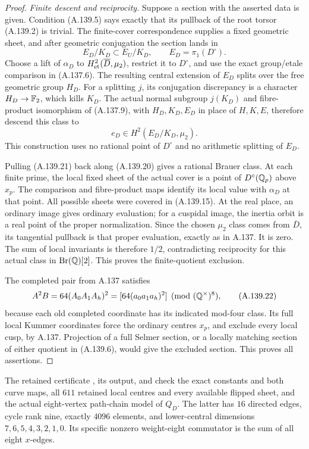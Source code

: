\begin{proof}
\emph{Finite descent and reciprocity.}
Suppose a section with the asserted data is given.
Condition (A.139.5) says exactly that its pullback of the root
torsor (A.139.2) is trivial.
The finite-cover correspondence supplies a fixed geometric sheet,
and after geometric conjugation the section lands in
\[
              E_D/K_D\subset E_U/K_D,\qquad
              E_D=\pi_1(D^\circ).
\tag{A.139.20}
\]
Choose a lift of \(\alpha_D\) to
\(H^2_{\rm et}(\overline D,\mu_2)\), restrict it to \(D^\circ\),
and use the exact group/etale comparison in (A.137.6).
The resulting central extension of \(E_D\) splits over the free
geometric group \(H_D\).
For a splitting \(j\), its conjugation discrepancy is a character
\(H_D\to\mathbb F_2\), which kills \(K_D\).
The actual normal subgroup \(j(K_D)\) and fibre-product isomorphism
of (A.137.9), with \(H_D,K_D,E_D\) in place of \(H,K,E\),
therefore descend this class to
\[
                               e_D\in H^2(E_D/K_D,\mu_2).
\tag{A.139.21}
\]
This construction uses no rational point of \(D^\circ\) and no
arithmetic splitting of \(E_D\).

Pulling (A.139.21) back along (A.139.20) gives a rational Brauer
class.  At each finite prime, the local fixed sheet of the actual
cover is a point of \(D^\circ(\mathbb Q_p)\) above \(x_p\).
The comparison and fibre-product maps identify its local value
with \(\alpha_D\) at that point.  All possible sheets were covered
in (A.139.15).  At the real place, an ordinary image gives ordinary
evaluation; for a cuspidal image, the inertia orbit is a real point
of the proper normalization.  Since the chosen \(\mu_2\) class
comes from \(\overline D\), its tangential pullback is that proper
evaluation, exactly as in A.137.  It is zero.
The sum of local invariants is therefore \(1/2\), contradicting
reciprocity for this actual class in \(\operatorname{Br}(\mathbb Q)[2]\).
This proves the finite-quotient exclusion.

The completed pair from A.137 satisfies
\[
             A^2B=64(A_0A_1A_h)^2
                    =[64(a_0a_1a_h)^2]\pmod{(\mathbb Q^\times)^8},
\tag{A.139.22}
\]
because each old completed coordinate has its indicated mod-four
class.  Its full local Kummer coordinates force the ordinary
centres \(x_p\), and exclude every local cusp, by A.137.
Projection of a full Selmer section, or a locally matching section
of either quotient in (A.139.6), would give the excluded section.
This proves all assertions.
\end{proof}

The retained certificate
, its output,
and 
check the exact constants and both curve maps, all \(611\) retained
local centres and every available flipped sheet, and the actual
eight-vertex path-chain model of \(Q_D\).
The latter has \(16\) directed edges, cycle rank nine, exactly
\(4096\) elements, and lower-central dimensions
\(7,6,5,4,3,2,1,0\).  Its specific nonzero weight-eight commutator
is the sum of all eight \(x\)-edges.
